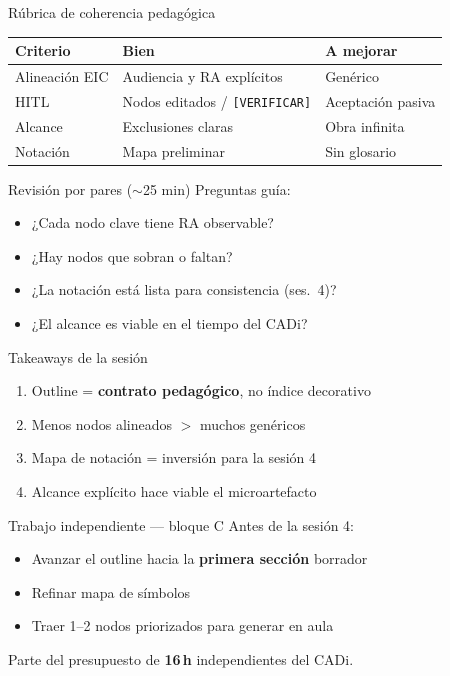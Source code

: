 \documentclass[aspectratio=169,11pt]{beamer}
\begin{document}
\begin{frame}{Rúbrica de coherencia pedagógica}
\begin{tabularx}{\textwidth}{@{}lXX@{}}
\toprule
Criterio & Bien & A mejorar \\
\midrule
Alineación EIC & Audiencia y RA explícitos & Genérico \\
HITL & Nodos editados / \texttt{[VERIFICAR]} & Aceptación pasiva \\
Alcance & Exclusiones claras & Obra infinita \\
Notación & Mapa preliminar & Sin glosario \\
\bottomrule
\end{tabularx}
\end{frame}

\begin{frame}{Revisión por pares ($\sim$25 min)}
Preguntas guía:
\begin{itemize}
\item ¿Cada nodo clave tiene RA observable?
\item ¿Hay nodos que sobran o faltan?
\item ¿La notación está lista para consistencia (ses.\ 4)?
\item ¿El alcance es viable en el tiempo del CADi?
\end{itemize}
\end{frame}

\begin{frame}{Takeaways de la sesión}
\begin{enumerate}
\item Outline = \textbf{contrato pedagógico}, no índice decorativo
\item Menos nodos alineados $>$ muchos genéricos
\item Mapa de notación = inversión para la sesión 4
\item Alcance explícito hace viable el microartefacto
\end{enumerate}
\end{frame}

\begin{frame}{Trabajo independiente --- bloque C}
Antes de la sesión 4:
\begin{itemize}
\item Avanzar el outline hacia la \textbf{primera sección} borrador
\item Refinar mapa de símbolos
\item Traer 1--2 nodos priorizados para generar en aula
\end{itemize}
Parte del presupuesto de \textbf{16\,h} independientes del CADi.
\end{frame}
\end{document}
